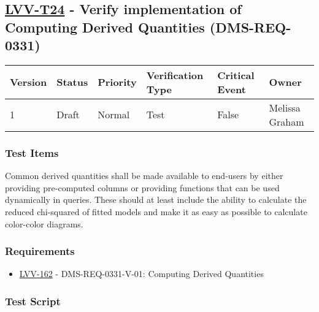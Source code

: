 \hypertarget{lvv-t24---verify-implementation-of-computing-derived-quantities-dms-req-0331}{%
\subsection{\texorpdfstring{\href{https://jira.lsstcorp.org/secure/Tests.jspa\#/testCase/LVV-T24}{LVV-T24}
- Verify implementation of Computing Derived Quantities
(DMS-REQ-0331)}{LVV-T24 - Verify implementation of Computing Derived Quantities (DMS-REQ-0331)}}\label{lvv-t24---verify-implementation-of-computing-derived-quantities-dms-req-0331}}

\begin{longtable}[]{@{}llllll@{}}
\toprule
Version & Status & Priority & Verification Type & Critical Event &
Owner\tabularnewline
\midrule
\endhead
1 & Draft & Normal & Test & False & Melissa Graham\tabularnewline
\bottomrule
\end{longtable}

\hypertarget{test-items-1}{%
\subsubsection{Test Items}\label{test-items-1}}

Common derived quantities shall be made available to end-users by either
providing pre-computed columns or providing functions that can be used
dynamically in queries. These should at least include the ability to
calculate the reduced chi-squared of fitted models and make it as easy
as possible to calculate color-color diagrams.

\hypertarget{requirements-1}{%
\subsubsection{Requirements}\label{requirements-1}}

\begin{itemize}
\tightlist
\item
  \href{https://jira.lsstcorp.org/browse/LVV-162}{LVV-162} -
  DMS-REQ-0331-V-01: Computing Derived Quantities
\end{itemize}

\hypertarget{test-script-1}{%
\subsubsection{Test Script}\label{test-script-1}}

